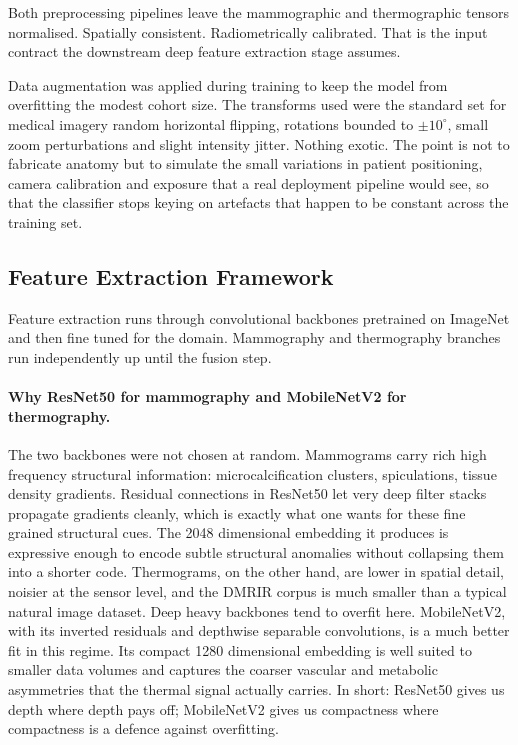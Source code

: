 \documentclass[lettersize,journal]{IEEEtran}
\begin{document}
Both preprocessing pipelines leave the mammographic and thermographic tensors normalised. Spatially consistent. Radiometrically calibrated. That is the input contract the downstream deep feature extraction stage assumes.

Data augmentation was applied during training to keep the model from overfitting the modest cohort size. The transforms used were the standard set for medical imagery random horizontal flipping, rotations bounded to $\pm 10^\circ$, small zoom perturbations and slight intensity jitter. Nothing exotic. The point is not to fabricate anatomy but to simulate the small variations in patient positioning, camera calibration and exposure that a real deployment pipeline would see, so that the classifier stops keying on artefacts that happen to be constant across the training set.
\subsection{Feature Extraction Framework}

Feature extraction runs through convolutional backbones pretrained on ImageNet and then fine tuned for the domain. Mammography and thermography branches run independently up until the fusion step.

\paragraph{Why ResNet50 for mammography and MobileNetV2 for thermography.} The two backbones were not chosen at random. Mammograms carry rich high frequency structural information: microcalcification clusters, spiculations, tissue density gradients. Residual connections in ResNet50 let very deep filter stacks propagate gradients cleanly, which is exactly what one wants for these fine grained structural cues. The 2048 dimensional embedding it produces is expressive enough to encode subtle structural anomalies without collapsing them into a shorter code. Thermograms, on the other hand, are lower in spatial detail, noisier at the sensor level, and the DMR\textendash IR corpus is much smaller than a typical natural image dataset. Deep heavy backbones tend to overfit here. MobileNetV2, with its inverted residuals and depthwise separable convolutions, is a much better fit in this regime. Its compact 1280 dimensional embedding is well suited to smaller data volumes and captures the coarser vascular and metabolic asymmetries that the thermal signal actually carries. In short: ResNet50 gives us depth where depth pays off; MobileNetV2 gives us compactness where compactness is a defence against overfitting.
\end{document}

